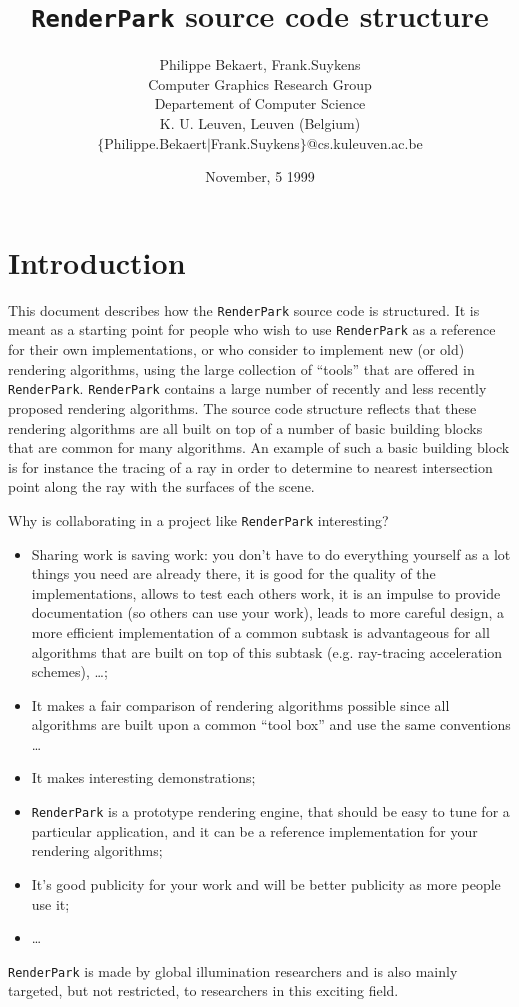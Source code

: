 \documentclass[11pt]{report}
\title {\bf {\tt RenderPark} source code structure}
\date{November, 5 1999}
\author{Philippe Bekaert, Frank.Suykens \\
 Computer Graphics Research Group \\
 Departement of Computer Science \\
 K. U. Leuven, Leuven (Belgium) \\
 $\{$Philippe.Bekaert$|$Frank.Suykens$\}$@cs.kuleuven.ac.be}
\begin{document}
\maketitle

\chapter*{Introduction}

This document describes how the {\tt RenderPark} source code is structured.
It is meant as a starting point for people who wish to use
{\tt RenderPark} as a reference for their own implementations, or
who consider to implement
new (or old) rendering algorithms, using the large collection of 
``tools'' that are offered in {\tt RenderPark}. {\tt RenderPark} contains 
a large number of
recently and less recently proposed rendering algorithms. The
source code structure reflects that these rendering
algorithms are all built on top of a number of basic building blocks
that are common for many algorithms. An example of such a basic building block is
for instance the tracing of a ray in order to determine to
nearest intersection point along the ray with the surfaces of the scene.

Why is collaborating in a project like {\tt RenderPark} interesting?
\begin{itemize}
\item Sharing work is saving work: you don't have to do everything yourself
  as a lot things you need are already there, it is good for the quality of the
  implementations, allows to test each others work, it is an impulse to
  provide documentation (so others can use your work), leads
  to more careful design, a more efficient implementation of a common
  subtask is advantageous for all algorithms that are built
  on top of this subtask (e\@.g\@. ray-tracing acceleration schemes), \ldots;
\item It makes a fair comparison of rendering algorithms possible since
  all algorithms are built upon a common ``tool box'' and use the same 
  conventions \ldots
\item It makes interesting demonstrations;
\item {\tt RenderPark} is a prototype rendering engine, that should be 
  easy to tune for a particular application, and it can be a
  reference implementation for your rendering algorithms;
\item It's good publicity for your work and will be better publicity as more
  people use it;
\item \ldots
\end{itemize}
{\tt RenderPark} is made by global illumination researchers and is also mainly
targeted, but not restricted, to researchers in this exciting field.
\end{document}
